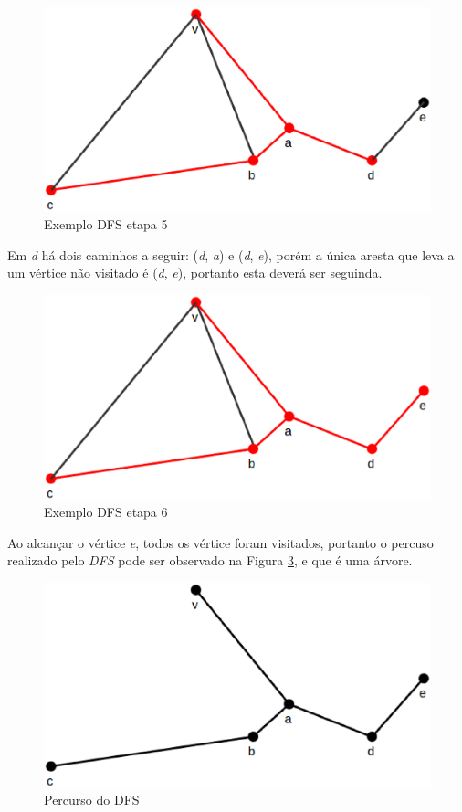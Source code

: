 \begin{figure}[!h]
	\centering
	\includegraphics[scale=0.4]{figuras/capitulo1/dfs/dfs5.eps}
	\caption{Exemplo DFS etapa 5}
	\label{dfs5}
\end{figure}

Em \textit{d} há dois caminhos a seguir: (\textit{d}, \textit{a}) e (\textit{d}, \textit{e}), porém a única aresta que leva a um vértice não visitado é (\textit{d}, \textit{e}), portanto esta deverá ser seguinda.

\begin{figure}[!h]
	\centering
	\includegraphics[scale=0.4]{figuras/capitulo1/dfs/dfs6.eps}
	\caption{Exemplo DFS etapa 6}
	\label{dfs6}
\end{figure}

Ao alcançar o vértice \textit{e}, todos os vértice foram visitados, portanto o percuso realizado pelo \textit{DFS} pode ser observado na Figura \ref{dfs_percurso}, e que é uma árvore.

\begin{figure}[!h]
	\centering
	\includegraphics[scale=0.4]{figuras/capitulo1/dfs/dfs_percurso.eps}
	\caption{Percurso do DFS}
	\label{dfs_percurso}
\end{figure}

